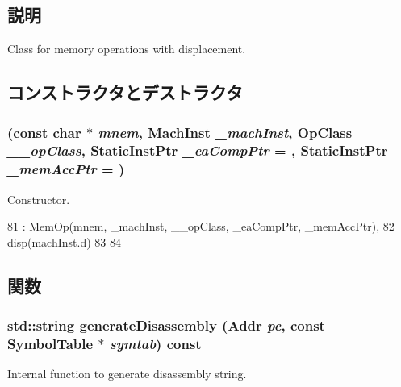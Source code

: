 \subsection{説明}
Class for memory operations with displacement. 

\subsection{コンストラクタとデストラクタ}
\hypertarget{classPowerISA_1_1MemDispOp_a2f30799c8ef4128f768bf7b737638ac2}{
\subsubsection[{MemDispOp}]{ (const char $\ast$ {\em mnem}, \/  {\bf MachInst} {\em \_\-machInst}, \/  OpClass {\em \_\-\_\-opClass}, \/  {\bf StaticInstPtr} {\em \_\-eaCompPtr} = {}, \/  {\bf StaticInstPtr} {\em \_\-memAccPtr} = {})}}
\label{classPowerISA_1_1MemDispOp_a2f30799c8ef4128f768bf7b737638ac2}


Constructor. 


\begin{DoxyCode}
81       : MemOp(mnem, _machInst, __opClass, _eaCompPtr, _memAccPtr),
82         disp(machInst.d)
83     {
84     }
\end{DoxyCode}


\subsection{関数}
\hypertarget{classPowerISA_1_1MemDispOp_a95d323a22a5f07e14d6b4c9385a91896}{
\subsubsection[{generateDisassembly}]{\setlength{\rightskip}{0pt plus 5cm}std::string generateDisassembly ({\bf Addr} {\em pc}, \/  const SymbolTable $\ast$ {\em symtab}) const}}
\label{classPowerISA_1_1MemDispOp_a95d323a22a5f07e14d6b4c9385a91896}
Internal function to generate disassembly string. 

